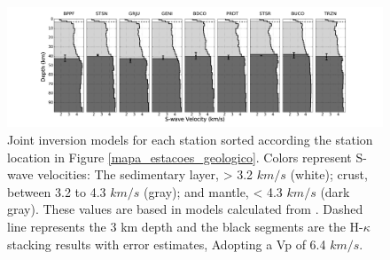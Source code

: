 \documentclass[paper,11pt]{geophysics}
\begin{document}
\begin{landscape}
\begin{figure}[!ht]
\begin{center}
\includegraphics[width=1.6\textwidth]{Fig/section_joint_inversion_25.pdf}
\caption{Joint inversion models for each station sorted according the station location in Figure \ref{mapa_estacoes_geologico}. Colors represent S-wave velocities: The sedimentary layer, > 3.2 $km/s$ (white); crust, between 3.2 to 4.3 $km/s$ (gray); and mantle, < 4.3 $km/s$ (dark gray). These values are based in models calculated from \cite{mooney_crust_1998}. Dashed line represents the 3 km depth and the black segments are the H-$\kappa$ stacking results with error estimates, Adopting a Vp of 6.4 $km/s$.}
\label{moisaic_joint_inversion}
\end{center}
\end{figure}
\end{landscape}
\end{document}
